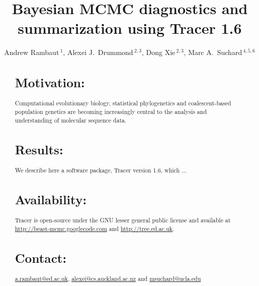 \documentclass{bioinfo}
\begin{document}

\title[Tracer 1.6]{Bayesian MCMC diagnostics and summarization using Tracer 1.6}

\author[Rambaut \textit{et~al}]{ Andrew Rambaut\,$^{1}$, Alexei J.~Drummond\,$^{2,3}$, Dong Xie\,$^{2,3}$, Marc A.~Suchard\,$^{4,5,6}$}

\address{
$^{1}$Institute of Evolutionary Biology, University of Edinburgh, Edinburgh, UK\\
$^{2}$Department of Computer Science, University of Auckland, Auckland, NZ\\
$^{3}$Centre for Computational Evolution, University of Auckland, Auckland, NZ\\
$^{4,5}$Departments of Biomathematics and Human Genetics, David Geffen School of Medicine at UCLA, and \\
$^{6}$Department of Biostatistics, UCLA Fielding School of Public Health, University of California, Los Angeles, USA \\
}



\maketitle


\begin{abstract}

\section{Motivation:}
Computational evolutionary biology, statistical phylogenetics and coalescent-based population genetics are becoming increasingly central to the analysis and understanding of molecular sequence data. 
\section{Results:}
We describe here a software package, Tracer version 1.6, which ... 
\section{Availability:}
Tracer is open-source under the GNU lesser general public license and available at \url{http://beast-mcmc.googlecode.com}  and  \href{http://tree.ed.ac.uk/software/tracer}{\url{http://tree.ed.ac.uk}}.

\section{Contact:} 
\href{a.rambaut@ed.ac.uk}{\url{a.rambaut@ed.ac.uk}}, 
\href{alexei@cs.auckland.ac.nz}{\url{alexei@cs.auckland.ac.nz}}
and 
\href{msuchard@ucla.edu}{\url{msuchard@ucla.edu}}

\end{abstract}
\end{document}
